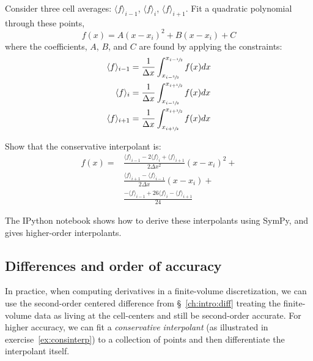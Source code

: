 \begin{exercise}
{\label{ex:consinterp} 

Consider three cell averages: $\langle f \rangle_{i-1}$, $\langle f \rangle_{i}$, $\langle f \rangle_{i+1}$.  Fit a quadratic polynomial through these points,
 \begin{equation}
 f(x) = A (x - x_i)^2 + B (x - x_i) + C
 \end{equation}
 where the coefficients, $A$, $B$, and $C$ are found by applying the constraints:
 \begin{align}
 \langle f\rangle_{i-1} &= \frac{1}{\Delta x}
      \int_{x_{i-\sfrac{3}{2}}}^{x_{i-\sfrac{1}{2}}} f(x) dx \\
 \langle f\rangle_{i} &= \frac{1}{\Delta x}
      \int_{x_{i-\sfrac{1}{2}}}^{x_{i+\sfrac{1}{2}}} f(x) dx \\
 \langle f\rangle_{i+1} &= \frac{1}{\Delta x}
      \int_{x_{i+\sfrac{1}{2}}}^{x_{i+\sfrac{3}{2}}} f(x) dx
 \end{align}

Show that the conservative interpolant is:
\begin{align}
f(x) = &\frac{\langle f\rangle_{i-1} - 2 \langle f\rangle_i +
             \langle f\rangle_{i+1}}{2\Delta x^2} (x-x_i)^2 + \nonumber \\
       &\frac{\langle f\rangle_{i+1} - \langle f\rangle_{i-1}}
            {2\Delta x} (x-x_i) + \nonumber \\
       &\frac{-\langle f\rangle_{i-1} + 26 \langle f\rangle_i
             -\langle f\rangle_{i+1}}{24}
\end{align}
}
\end{exercise}

The {\sf IPython} notebook
shows how to derive these interpolants using {\sf SymPy}, and gives
higher-order interpolants.


\subsection{Differences and order of accuracy}

In practice, when computing derivatives in a finite-volume
discretization, we can use the second-order centered difference from
\S~\ref{ch:intro:diff} treating the finite-volume data as living at the
cell-centers and still be second-order accurate.  For higher accuracy,
we can fit a {\em conservative interpolant} (as illustrated in
exercise~\ref{ex:consinterp}) to a collection of points and then
differentiate the interpolant itself.  


